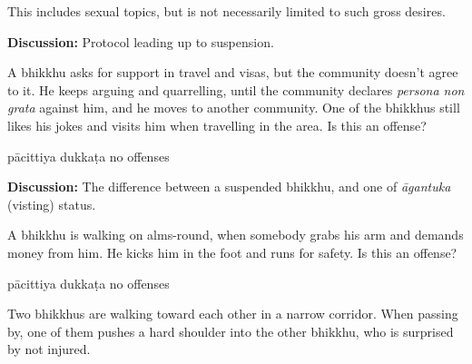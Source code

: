 \begin{exam}{\autoExamName}
\begin{problem}
\begin{solution}
    This includes sexual topics, but is not necessarily limited to such gross desires.
  \end{solution}

  \bigskip

  \textbf{Discussion:} Protocol leading up to suspension.

  \end{problem}

  \problemDivide

  \begin{problem}

    A bhikkhu asks for support in travel and visas, but the community doesn't
    agree to it. He keeps arguing and quarrelling, until the community declares
    \textit{persona non grata} against him, and he moves to another community.
    One of the bhikkhus still likes his jokes and visits him when travelling in
    the area. Is this an offense?

    \bigskip

    \begin{answers}{3}
      \bChoices
       pācittiya\eAns
       dukkaṭa\eAns
       no offenses\eAns
      \eChoices
    \end{answers}

    \bigskip

    \textbf{Discussion:} The difference between a suspended bhikkhu, and one
    of \textit{āgantuka} (visting) status.

  \end{problem}

  \problemDivide

  \begin{problem}

    A bhikkhu is walking on alms-round, when somebody grabs his arm and demands money from him. 
    He kicks him in the foot and runs for safety. Is this an offense?

    \bigskip

    \begin{answers}{3}
      \bChoices
       pācittiya\eAns
       dukkaṭa\eAns
       no offenses\eAns
      \eChoices
    \end{answers}

  \end{problem}

  \problemDivide

  \begin{problem}

    Two bhikkhus are walking toward each other in a narrow corridor. When
    passing by, one of them pushes a hard shoulder into the other bhikkhu, who
    is surprised by not injured.


\end{problem}
\end{exam}
